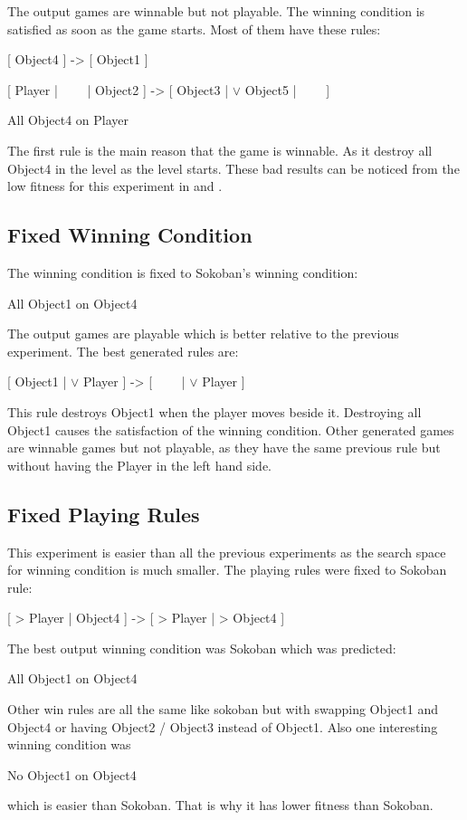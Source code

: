 
The output games are winnable but not playable. The winning condition is satisfied as soon as the game starts. Most of them have these rules:
\begin{center}
[ Object4 ] -> [ Object1 ]
\end{center}
\begin{center}
[ Player | \ \ \ \ |  Object2 ] -> [  Object3 | $\vee$ Object5 | \ \ \ \ ]
\end{center}
\begin{center}
All Object4 on Player
\end{center}
The first rule is the main reason that the game is winnable. As it destroy all Object4 in the level as the level starts. These bad results can be noticed from the low fitness for this experiment in  and .

\subsection{Fixed Winning Condition}
The winning condition is fixed to Sokoban's winning condition:
\begin{center}
All Object1 on Object4
\end{center}

The output games are playable which is better relative to the previous experiment. The best generated rules are:
\begin{center}
[  Object1 | $\vee$ Player ] -> [ \ \ \ \ | $\vee$ Player ]
\end{center}
This rule destroys Object1 when the player moves beside it. Destroying all Object1 causes the satisfaction of the winning condition. Other generated games are winnable games but not playable, as they have the same previous rule but without having the Player in the left hand side.

\subsection{Fixed Playing Rules}
This experiment is easier than all the previous experiments as the search space for winning condition is much smaller. The playing rules were fixed to Sokoban rule:
\begin{center}
[ > Player | Object4 ] -> [ > Player | > Object4 ]
\end{center}

The best output winning condition was Sokoban which was predicted:
\begin{center}
All Object1 on Object4
\end{center}
Other win rules are all the same like sokoban but with swapping Object1 and Object4 or having Object2 / Object3 instead of Object1. Also one interesting winning condition was 
\begin{center}
No Object1 on Object4
\end{center}
which is easier than Sokoban. That is why it has lower fitness than Sokoban.